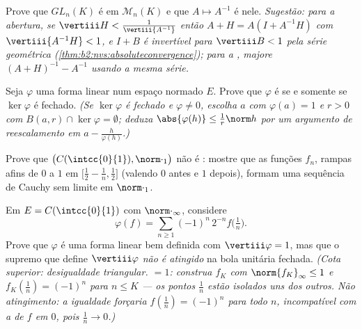 \begin{exercise}[$\star\star$]\label{exo:b2:nvs:5}
Prove que $GL_n(K)$ é  em $\mathcal{M}_n(K)$ e que $A
\mapsto A^{-1}$ é  nele. \emph{Sugestão: para a abertura, se
$\vertiii H < \frac{1}{\vertiii{A^{-1}}}$ então $A + H = A(I +
A^{-1}H)$ com $\vertiii{A^{-1}H} < 1$, e $I + B$ é invertível
para $\vertiii B < 1$ pela série geométrica
(\cref{thm:b2:nvs:absoluteconvergence}); para a , majore
$(A+H)^{-1} - A^{-1}$ usando a mesma série.}
\end{exercise}

\begin{exercise}[$\star\star$]\label{exo:b2:nvs:6}
Seja $\varphi$ uma forma linear num espaço normado $E$. Prove que
$\varphi$ é  se e somente se $\ker\varphi$ é fechado.
\emph{(Se $\ker\varphi$ é fechado e $\varphi \neq 0$, escolha $a$
com $\varphi(a) = 1$ e $r > 0$ com $B(a, r) \cap \ker\varphi =
\emptyset$; deduza $\abs{\varphi(h)} \leq \frac{1}{r}\norm h$ por um
argumento de reescalamento em $a - \frac{h}{\varphi(h)}$.)}
\end{exercise}

\begin{exercise}[$\star\star$]\label{exo:b2:nvs:7}
Prove que $\bigl(C(\intcc{0}{1}), \norm\cdot_1\bigr)$ não é
: mostre que as funções $f_n$, rampas afins de $0$ a
$1$ em $\bigl[\frac12 - \frac1n, \frac12\bigr]$ (valendo $0$
antes e $1$ depois), formam uma sequência de Cauchy sem limite
 em $\norm\cdot_1$.
\end{exercise}

\begin{exercise}[$\star\star\star$]\label{exo:b2:nvs:8}
Em $E = C(\intcc{0}{1})$ com $\norm\cdot_\infty$, considere
\[
\varphi(f) = \sum_{n \geq 1} (-1)^n\, 2^{-n} f\bigl(\tfrac1n\bigr).
\]
Prove que $\varphi$ é uma forma linear  bem definida com
$\vertiii\varphi = 1$, mas que o supremo que define
$\vertiii\varphi$ \emph{não é atingido} na bola unitária fechada.
\emph{(Cota superior: desigualdade triangular.  $= 1$: construa
$f_K$  com $\norm{f_K}_\infty \leq 1$ e $f_K(\frac1n)
= (-1)^n$ para $n \leq K$ --- os pontos $\frac1n$ estão isolados uns
dos outros. Não atingimento: a igualdade forçaria $f(\frac1n) =
(-1)^n$ para todo $n$, incompatível com a  de $f$ em $0$,
pois $\frac1n \to 0$.)}
\end{exercise}

